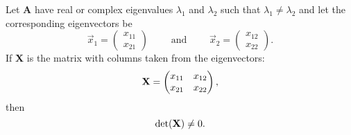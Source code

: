 \begin{theorem}
Let {\bf A} have real or complex eigenvalues $\lambda_1$ and $\lambda_2$ such that $\lambda_1 \neq \lambda_2$ and let the corresponding eigenvectors be
$$
\vec{x}_1 = \begin{pmatrix} x_{11}  \\ x_{21} \end{pmatrix}
\qquad \text{ and } \qquad
\vec{x}_2 = \begin{pmatrix} x_{12}  \\ x_{22} \end{pmatrix}.
$$
If {\bf X} is the matrix with columns taken from the eigenvectors:
$$
{\bf X} = \begin{pmatrix}
x_{11} & x_{12} \\
x_{21} & x_{22}
\end{pmatrix},
$$
then 
$$\det({\bf X}) \neq 0.$$
\end{theorem}





